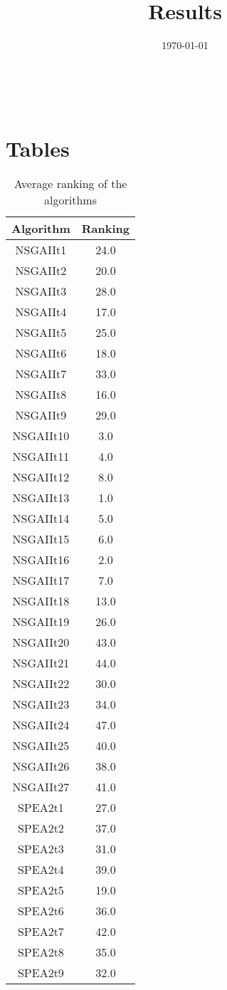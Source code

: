 \documentclass{article}
\title{Results}
\author{}
\date{\today}
\begin{document}
\oddsidemargin 0in \topmargin 0in\maketitle
\
\section{Tables}
\begin{table}[!htp]
\centering
\caption{Average ranking of the algorithms}
\begin{tabular}{c|c}
Algorithm&Ranking\\
\hline
NSGAIIt1&24.0\\
NSGAIIt2&20.0\\
NSGAIIt3&28.0\\
NSGAIIt4&17.0\\
NSGAIIt5&25.0\\
NSGAIIt6&18.0\\
NSGAIIt7&33.0\\
NSGAIIt8&16.0\\
NSGAIIt9&29.0\\
NSGAIIt10&3.0\\
NSGAIIt11&4.0\\
NSGAIIt12&8.0\\
NSGAIIt13&1.0\\
NSGAIIt14&5.0\\
NSGAIIt15&6.0\\
NSGAIIt16&2.0\\
NSGAIIt17&7.0\\
NSGAIIt18&13.0\\
NSGAIIt19&26.0\\
NSGAIIt20&43.0\\
NSGAIIt21&44.0\\
NSGAIIt22&30.0\\
NSGAIIt23&34.0\\
NSGAIIt24&47.0\\
NSGAIIt25&40.0\\
NSGAIIt26&38.0\\
NSGAIIt27&41.0\\
SPEA2t1&27.0\\
SPEA2t2&37.0\\
SPEA2t3&31.0\\
SPEA2t4&39.0\\
SPEA2t5&19.0\\
SPEA2t6&36.0\\
SPEA2t7&42.0\\
SPEA2t8&35.0\\
SPEA2t9&32.0\\

\end{tabular}
\end{table}
\end{document}
